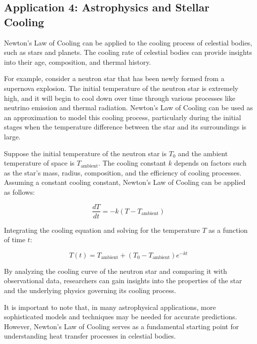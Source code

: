 \documentclass[12pt, a4paper]{article}
\begin{document}
\subsection{Application 4: Astrophysics and Stellar Cooling}
Newton's Law of Cooling can be applied to the cooling process of celestial bodies, such as stars and planets. The cooling rate of celestial bodies can provide insights into their age, composition, and thermal history.

For example, consider a neutron star that has been newly formed from a supernova explosion. The initial temperature of the neutron star is extremely high, and it will begin to cool down over time through various processes like neutrino emission and thermal radiation. Newton's Law of Cooling can be used as an approximation to model this cooling process, particularly during the initial stages when the temperature difference between the star and its surroundings is large.

Suppose the initial temperature of the neutron star is $T_0$ and the ambient temperature of space is $T_{\text{ambient}}$. The cooling constant $k$ depends on factors such as the star's mass, radius, composition, and the efficiency of cooling processes. Assuming a constant cooling constant, Newton's Law of Cooling can be applied as follows:

\begin{equation}
\frac{dT}{dt} = -k(T - T_{\text{ambient}})
\end{equation}

Integrating the cooling equation and solving for the temperature $T$ as a function of time $t$:

\begin{equation}
T(t) = T_{\text{ambient}} + (T_0 - T_{\text{ambient}}) e^{-kt}
\end{equation}

By analyzing the cooling curve of the neutron star and comparing it with observational data, researchers can gain insights into the properties of the star and the underlying physics governing its cooling process.

\vspace{12pt}

It is important to note that, in many astrophysical applications, more sophisticated models and techniques may be needed for accurate predictions. However, Newton's Law of Cooling serves as a fundamental starting point for understanding heat transfer processes in celestial bodies.
\end{document}
